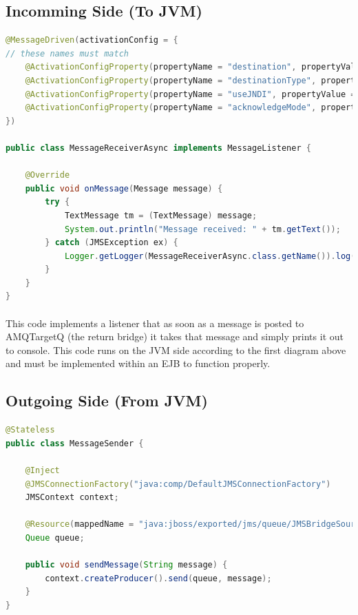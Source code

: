 \documentclass[
10pt, %
letterpaper, %
oneside, %
headinclude,footinclude, %
BCOR5mm, %
]{scrartcl}
\begin{document}

\subsection {\textbf{Incomming Side (To JVM)}}

\begin{lstlisting}[language=Java]
@MessageDriven(activationConfig = {
// these names must match
    @ActivationConfigProperty(propertyName = "destination", propertyValue = "java:jboss/exported/jms/queue/AMQTargetQ"),
    @ActivationConfigProperty(propertyName = "destinationType", propertyValue = "javax.jms.Queue"),
    @ActivationConfigProperty(propertyName = "useJNDI", propertyValue = "true"),
    @ActivationConfigProperty(propertyName = "acknowledgeMode", propertyValue = "Auto-acknowledge")
})

public class MessageReceiverAsync implements MessageListener {

    @Override
    public void onMessage(Message message) {
        try {
            TextMessage tm = (TextMessage) message;
            System.out.println("Message received: " + tm.getText());
        } catch (JMSException ex) {
            Logger.getLogger(MessageReceiverAsync.class.getName()).log(Level.SEVERE, null, ex);
        }
    }
}
\end{lstlisting}

\paragraph{}
This code implements a listener that as soon as a message is posted to AMQTargetQ  (the return bridge) it takes that message and simply prints it out to console. This code runs on the JVM side according to the first diagram above and must be implemented within an EJB to function properly.


\subsection{\textbf{Outgoing Side (From JVM)}}

\begin{lstlisting}[language=Java]
@Stateless
public class MessageSender {

    @Inject
    @JMSConnectionFactory("java:comp/DefaultJMSConnectionFactory")
    JMSContext context;

    @Resource(mappedName = "java:jboss/exported/jms/queue/JMSBridgeSourceQ")
    Queue queue;

    public void sendMessage(String message) {
        context.createProducer().send(queue, message);
    }
}
\end{lstlisting}
\end{document}
